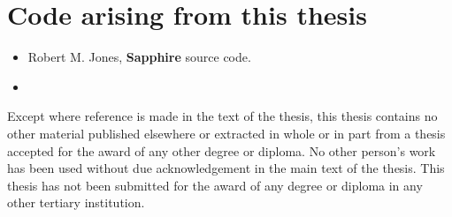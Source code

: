\section{Code arising from this thesis}

\begin{itemize}
    \item \cite{Sapphire} Robert M. Jones, \textbf{Sapphire} source code.
    \item 
\end{itemize}

Except where reference is made in the text of the thesis, this thesis contains no other material published elsewhere or extracted in whole or in part from a thesis accepted for the award of any other degree or diploma. No other person's work has been used without due acknowledgement in the main text of the thesis. This thesis has not been submitted for the award of any degree or diploma in any other tertiary institution.

